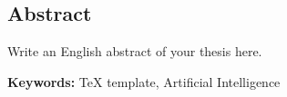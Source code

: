 \pagestyle{plain}

{}

\begin{latin}
	
\section*{Abstract}
Write an English abstract of your thesis here.
	
\vspace{2cm}
\noindent \textbf{Keywords:}
TeX template, Artificial Intelligence
	
\end{latin}